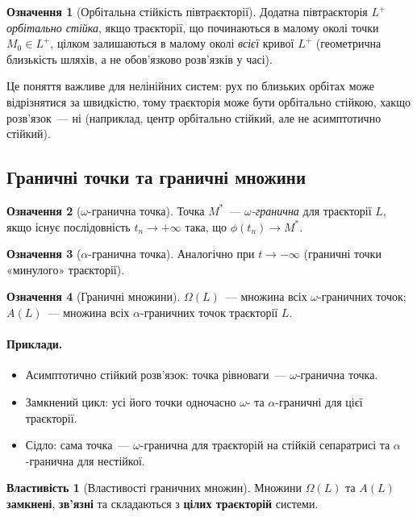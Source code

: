 \documentclass[12pt,a4paper]{article}
\theoremstyle{definition}
\newtheorem{ozn}{Означення}[section]
\newtheorem{vlast}{Властивість}[section]
\theoremstyle{plain}
\begin{document}
\begin{ozn}[Орбітальна стійкість півтраєкторії]
Додатна півтраєкторія $L^+$ \emph{орбітально стійка}, якщо траєкторії,
що починаються в малому околі точки $M_0\in L^+$, цілком залишаються в
малому околі \emph{всієї} кривої $L^+$ (геометрична близькість шляхів, а не
обов'язково розв'язків у часі).
\end{ozn}

Це поняття важливе для нелінійних систем: рух по близьких орбітах може
відрізнятися за швидкістю, тому траєкторія може бути орбітально стійкою,
хакщо розв'язок~--- ні (наприклад, центр орбітально стійкий, але не
асимптотично стійкий).

\subsection{Граничні точки та граничні множини}

\begin{ozn}[$\omega$-гранична точка]
Точка $M^*$~--- \emph{$\omega$-гранична} для траєкторії $L$, якщо існує
послідовність $t_n\to+\infty$ така, що $\phi(t_n)\to M^*$.
\end{ozn}

\begin{ozn}[$\alpha$-гранична точка]
Аналогічно при $t\to-\infty$ (граничні точки «минулого» траєкторії).
\end{ozn}

\begin{ozn}[Граничні множини]
\emph{$\Omega(L)$}~--- множина всіх $\omega$-граничних точок;
\emph{$A(L)$}~--- множина всіх $\alpha$-граничних точок траєкторії $L$.
\end{ozn}

\paragraph{Приклади.}
\begin{itemize}[leftmargin=1.4em]
  \item Асимптотично стійкий розв'язок: точка рівноваги~--- $\omega$-гранична
        точка.
  \item Замкнений цикл: усі його точки одночасно $\omega$- та
        $\alpha$-граничні для цієї траєкторії.
  \item Сідло: сама точка~--- $\omega$-гранична для траєкторій на стійкій
        сепаратрисі та $\alpha$-гранична для нестійкої.
\end{itemize}

\begin{vlast}[Властивості граничних множин]
Множини $\Omega(L)$ та $A(L)$ \textbf{замкнені}, \textbf{зв'язні} та
складаються з \textbf{цілих траєкторій} системи.
\end{vlast}
\end{document}

